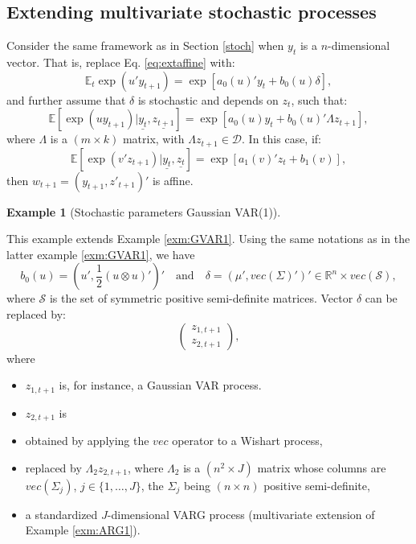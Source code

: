 \documentclass[
  12pt,
]{book}
\providecommand{\tightlist}{%
  \setlength{\itemsep}{0pt}\setlength{\parskip}{0pt}}
\theoremstyle{definition}
\theoremstyle{definition}
\newtheorem{example}{Example}[chapter]
\theoremstyle{definition}
\theoremstyle{definition}
\theoremstyle{remark}
\begin{document}
\hypertarget{extending-multivariate-stochastic-processes}{%
\subsection{Extending multivariate stochastic processes}\label{extending-multivariate-stochastic-processes}}

Consider the same framework as in Section \ref{stoch} when \(y_t\) is a \(n\)-dimensional vector. That is, replace Eq. \eqref{eq:extaffine} with:
\begin{equation}
\mathbb{E}_t   \exp(u' y_{t+1}) = \exp[a_0(u)'y_t+b_0(u)\delta],\label{eq:Multiextaffine}
\end{equation}
and further assume that \(\delta\) is stochastic and depends on \(z_t\), such that:
\[
\mathbb{E}[\exp(u y_{t+1})|\underline{y_t}, \underline{z_{t+1}}] = \exp[a_0(u)y_t+b_0(u)'\Lambda z_{t+1}],
\]
where \(\Lambda\) is a \((m\times k)\) matrix, with \(\Lambda z_{t+1} \in \mathcal{D}\). In this case, if:
\[
\mathbb{E}[\exp(v' z_{t+1})|\underline{y_t}, \underline{z_{t}}] = \exp[a_1(v)'z_t+b_1(v)],
\]
then \(w_{t+1} = (y_{t+1}, z'_{t+1})'\) is affine.

\begin{example}[Stochastic parameters Gaussian VAR(1)]
\protect\hypertarget{exm:RSVAR}{}\label{exm:RSVAR}

This example extends Example \ref{exm:GVAR1}. Using the same notations as in the latter example \ref{exm:GVAR1}, we have
\[
b_0(u) = \left(u', \frac{1}{2} (u \otimes u)'\right)' \quad \mbox{and} \quad\delta = (\mu', vec(\Sigma)')' \in \mathbb{R}^n \times vec(\mathcal{S}),
\]
where \(\mathcal{S}\) is the set of symmetric positive semi-definite matrices. Vector \(\delta\) can be replaced by:
\[
\left( \begin{array}{l} z_{1,t+1}
\\ z_{2,t+1}
\end{array} \right),
\]
where

\begin{itemize}
\tightlist
\item
  \(z_{1,t+1}\) is, for instance, a Gaussian VAR process.
\item
  \(z_{2,t+1}\) is
\item
  obtained by applying the \(vec\) operator to a Wishart process,
\item
  replaced by \(\Lambda_2 z_{2,t+1}\), where \(\Lambda_2\) is a \((n^2 \times J)\) matrix whose columns are \(vec(\Sigma_j)\), \(j \in \{1,\dots,J\}\), the \(\Sigma_j\) being \((n \times n)\) positive semi-definite,
\item
  a standardized \(J\)-dimensional VARG process (multivariate extension of Example \ref{exm:ARG1}).
\end{itemize}

\end{example}
\end{document}
